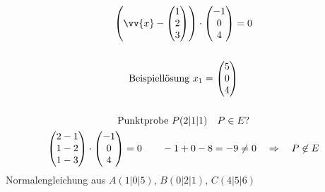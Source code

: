 \begin{gather*}
  \left(\vv{x} - \begin{pmatrix}1 \\ 2 \\ 3\end{pmatrix}\right) \cdot \begin{pmatrix}-1 \\ 0 \\ 4\end{pmatrix} = 0 \\\\
  \text{Beispiellösung } x_1 = \begin{pmatrix}5 \\ 0 \\ 4\end{pmatrix} \\\\
  \text{Punktprobe } P(2|1|1) \quad P \in E ? \\
  \begin{pmatrix}2 - 1 \\ 1 - 2 \\ 1 - 3\end{pmatrix} \cdot \begin{pmatrix}-1 \\ 0 \\ 4\end{pmatrix} = 0 \qquad -1 + 0 - 8 = -9 \neq 0 \quad\Rightarrow\quad P \not\in E
\end{gather*}
Normalengleichung aus $A(1|0|5)$, $B(0|2|1)$, $C(4|5|6)$
